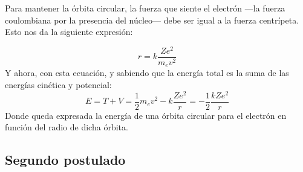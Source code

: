 \documentclass[12pt,a4paper]{article}
\begin{document}
Para mantener la órbita circular, la fuerza que siente el electrón —la fuerza coulombiana por la presencia del núcleo— debe ser igual a la fuerza centrípeta. Esto nos da la siguiente expresión:

\begin{equation}
r=k\dfrac{Ze^{2}}{m_{e}v^{2}}
\end{equation}
Y ahora, con esta ecuación, y sabiendo que la energía total es la suma de las energías cinética y potencial:
\begin{equation}
E=T+V=\dfrac{1}{2}m_{e}v^{2}-k\dfrac{Ze^{2}}{r}=-\dfrac{1}{2}\dfrac{kZe^{2}}{r}
\end{equation}
Donde queda expresada la energía de una órbita circular para el electrón en función del radio de dicha órbita.

\subsection*{Segundo postulado}
\end{document}
